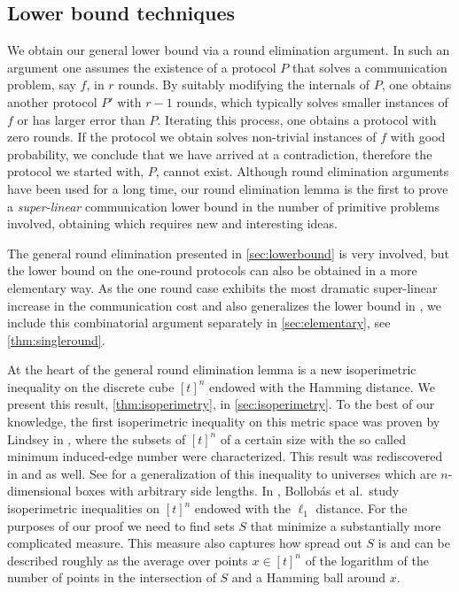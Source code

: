 \subsection{Lower bound techniques}

We obtain our general lower bound via a round elimination
argument. In such an argument one assumes the existence of a
protocol $P$ that solves a communication problem, say $f$, in
$r$ rounds. By suitably modifying the internals of $P$, one
obtains another protocol $P'$ with $r-1$ rounds, which typically
solves smaller instances of $f$ or has larger error than $P$.
Iterating this process, one obtains a protocol with zero rounds.
If the protocol we obtain solves non-trivial instances of $f$
with good probability, we conclude that we have arrived at a
contradiction, therefore the protocol we started with, $P$,
cannot exist. Although round elimination arguments have been
used for a long time, our round elimination lemma is the first
to prove a {\em super-linear} communication lower bound in the
number of primitive problems involved, obtaining which requires
new and interesting ideas.

The general round elimination presented in
\autoref{sec:lowerbound} is very involved, but the lower bound
on the one-round protocols can also be obtained in a more
elementary way. As the one round case exhibits the most dramatic
super-linear increase in the communication cost and also
generalizes the lower bound in \cite{MolinaroWY2013}, we include
this combinatorial argument separately in
\autoref{sec:elementary}, see \autoref{thm:singleround}.

At the heart of the general round elimination lemma is a new
isoperimetric inequality on the discrete cube $[t]^n$ endowed
with the Hamming distance. We present this result,
\autoref{thm:isoperimetry}, in \autoref{sec:isoperimetry}. To
the best of our knowledge, the first isoperimetric inequality on
this metric space was proven by Lindsey in \cite{Lindsey1964},
where the subsets of $[t]^n$ of a certain size with the so
called minimum induced-edge number were characterized. This
result was rediscovered in \cite{KleitmanKR1971} and
\cite{Clements1971} as well. See \cite{AzizogluO2003} for a
generalization of this inequality to universes which are
$n$-dimensional boxes with arbitrary side lengths. In
\cite{BollobasL1991}, Bollobás et al.\ study isoperimetric
inequalities on $[t]^n$ endowed with the $\ell_1$ distance. For
the purposes of our proof we need to find sets $S$ that minimize
a substantially more complicated measure. This measure also
captures how spread out $S$ is and can be described roughly as
the average over points $x\in[t]^n$ of the logarithm of the
number of points in the intersection of $S$ and a Hamming ball
around $x$.

